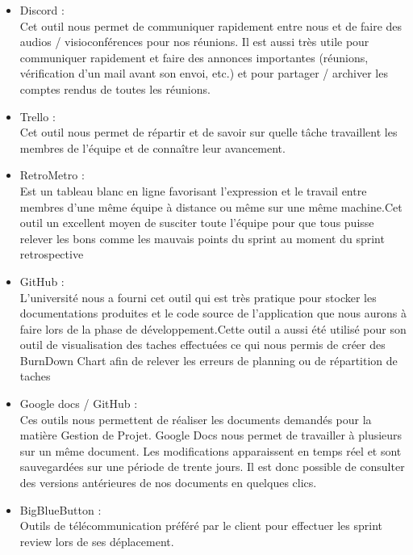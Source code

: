 \begin{itemize}
	\item Discord :\\
	Cet outil nous permet de communiquer rapidement entre nous et
    de faire des audios / visioconférences pour nos réunions. Il est aussi très utile
    pour communiquer rapidement et faire des annonces importantes (réunions,
    vérification d’un mail avant son envoi, etc.) et pour partager / archiver les
    comptes rendus de toutes les réunions.\\
	
    \item Trello :\\
	Cet outil nous permet de répartir et de savoir sur quelle tâche
    travaillent les membres de l’équipe et de connaître leur avancement.\\
    
    \item RetroMetro :\\
    Est un tableau blanc en ligne favorisant l’expression et le travail entre membres d’une même équipe 
    à distance ou même sur une même machine.Cet outil un excellent moyen de susciter toute l'équipe pour
    que tous puisse relever les bons comme les mauvais points du sprint au moment du sprint retrospective\\

    \item GitHub :\\
	L’université nous a fourni cet outil qui est très pratique pour stocker
    les documentations produites et le code source de l’application que nous
    aurons à faire lors de la phase de développement.Cette outil a aussi été utilisé pour son outil de visualisation des taches effectuées
		ce qui nous permis de créer des BurnDown Chart afin de relever les erreurs de planning ou de répartition de taches\\
	
    \item Google docs / GitHub :\\
	Ces outils nous permettent de réaliser les documents demandés
    pour la matière Gestion de Projet. Google Docs nous permet de travailler à
    plusieurs sur un même document. Les modifications apparaissent en temps
    réel et sont sauvegardées sur une période de trente jours. Il est donc possible
    de consulter des versions antérieures de nos documents en quelques clics.\\

		\item BigBlueButton :\\
		Outils de télécommunication préféré par le client pour effectuer les sprint review lors de ses déplacement.	


\end{itemize}

